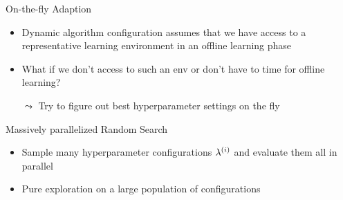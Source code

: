 	
\begin{frame}[c]{On-the-fly Adaption}

\begin{itemize}
	\item Dynamic algorithm configuration assumes that we have access to a \alert{representative learning environment} in an \alert{offline learning phase}
	\pause
	\item What if we don't access to such an env or don't have to time for offline learning?
	\pause
	\bigskip
	\item[$\leadsto$] Try to figure out best hyperparameter settings on the fly
\end{itemize}

\end{frame}
\begin{frame}[c]{Massively parallelized Random Search}


\bigskip
\begin{itemize}
	\item Sample many hyperparameter configurations $\mathbf{\lambda}^{(i)}$ and evaluate them all in parallel
	\pause
	\item Pure exploration on a large population of configurations
\end{itemize}

\end{frame}
